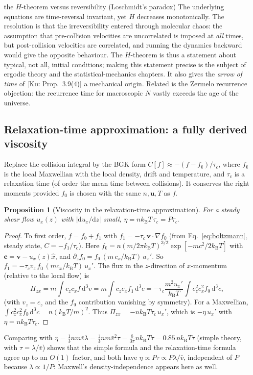\documentclass[11pt,a4paper]{report}
\theoremstyle{definition}
\theoremstyle{plain}
\newtheorem{proposition}[definition]{Proposition}
\newcommand{\KD}[1]{[\textsc{Kd}: #1]}   %
\newcommand{\kB}{k_{\mathrm{B}}}
\newcommand{\dd}{\mathrm{d}}
\newcommand{\vv}{\mathbf{v}}
\newcommand{\vbar}{\bar{v}}
\begin{document}
\begin{pitfall}{the $H$-theorem versus reversibility (Loschmidt's paradox)}
The underlying equations are time-reversal invariant, yet $H$ decreases monotonically. The resolution is that the irreversibility entered through molecular chaos: the assumption that pre-collision velocities are uncorrelated is imposed at \emph{all} times, but post-collision velocities are correlated, and running the dynamics backward would give the opposite behaviour. The $H$-theorem is thus a statement about typical, not all, initial conditions; making this statement precise is the subject of ergodic theory and the statistical-mechanics chapters. It also gives the \emph{arrow of time} of \KD{Prop.~3.9(4)} a mechanical origin. Related is the Zermelo recurrence objection: the recurrence time for macroscopic $N$ vastly exceeds the age of the universe.
\end{pitfall}

\subsection{Relaxation-time approximation: a fully derived viscosity}

Replace the collision integral by the BGK form $C[f]\approx-(f-f_0)/\tau_c$, where $f_0$ is the local Maxwellian with the local density, drift and temperature, and $\tau_c$ is a relaxation time (of order the mean time between collisions). It conserves the right moments provided $f_0$ is chosen with the same $n,\mathbf u,T$ as $f$.

\begin{proposition}[Viscosity in the relaxation-time approximation]\label{prop:BGK}
For a steady shear flow $u_x(z)$ with $|\dd u_x/\dd z|$ small, $\eta=n\kB T\,\tau_c=P\tau_c$.
\end{proposition}
\begin{proof}
To first order, $f=f_0+f_1$ with $f_1=-\tau_c\,\vv\cdot\nabla f_0$ (from Eq.~\eqref{eq:boltzmann}, steady state, $C=-f_1/\tau_c$). Here $f_0=n(m/2\pi\kB T)^{3/2}\exp[-mc^2/2\kB T]$ with $\mathbf c=\vv-u_x(z)\hat x$, and $\partial_zf_0=f_0\,(m\,c_x/\kB T)\,u_x'$. So $f_1=-\tau_cv_z\,f_0\,(mc_x/\kB T)\,u_x'$. The flux in the $z$-direction of $x$-momentum (relative to the local flow) is
\[
\Pi_{zx}=m\int c_zc_xf\,\dd^3v=m\int c_zc_xf_1\,\dd^3c=-\tau_c\frac{m^2u_x'}{\kB T}\int c_z^2c_x^2f_0\,\dd^3c,
\]
(with $v_z=c_z$ and the $f_0$ contribution vanishing by symmetry). For a Maxwellian, $\int c_z^2c_x^2f_0\,\dd^3c=n(\kB T/m)^2$. Thus $\Pi_{zx}=-n\kB T\tau_c\,u_x'$, which is $-\eta\,u_x'$ with $\eta=n\kB T\tau_c$.
\end{proof}
Comparing with $\eta=\tfrac13nm\vbar\lambda=\tfrac13nm\vbar^2\tau=\tfrac{8}{3\pi}n\kB T\tau=0.85\,n\kB T\tau$ (simple theory, with $\tau=\lambda/\vbar$) shows that the simple formula and the relaxation-time formula agree up to an $O(1)$ factor, and both have $\eta\propto P\tau\propto P\lambda/\vbar$, independent of $P$ because $\lambda\propto1/P$: Maxwell's density-independence appears here as well.
\end{document}
